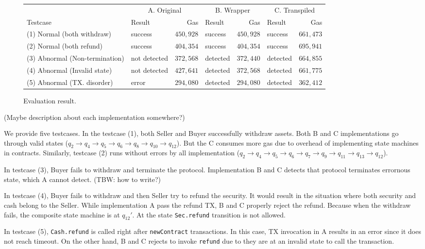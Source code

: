 \documentclass[english]{jsarticle}
\begin{document}
\begin{figure}
\centering
\begin{tabular}{llrlrlr}\toprule
& \multicolumn{2}{c}{A. Original}
& \multicolumn{2}{c}{B. Wrapper}
& \multicolumn{2}{c}{C. Transpiled} \\
\cmidrule(lr){2-3} \cmidrule(lr){4-5} \cmidrule(lr){6-7}
Testcase & Result & Gas & Result & Gas & Result & Gas \\
\midrule
(1) Normal (both withdraw) & success & $450,928$ & success & $450,928$ & success & $661,473$ \\
(2) Normal (both refund) & success & $404,354$ & success & $404,354$ & success & $695,941$ \\
(3) Abnormal (Non-termination) & not detected & $372,568$ & detected & $372,440$ & detected & $664,855$ \\
(4) Abnormal (Invalid state) & not detected & $427,641$ & detected & $372,568$ & detected & $661,775$ \\
(5) Abnormal (TX. disorder) & error & $294,080$ & detected & $294,080$ & detected & $362,412$ \\
\bottomrule
\end{tabular}
\caption{Evaluation result.}
\end{figure}

(Maybe description about each implementation somewhere?)

We provide five testcases.
In the testcase (1), both Seller and Buyer successfully withdraw assets. 
Both B and C implementations go through valid states ($q_2\to q_4\to q_5\to q_6 \to q_8\to q_{10}\to q_{12}$).
But the C consumes more gas due to overhead of implementing state machines in contracts.
Similarly, testcase (2) runs without errors by all implementation ($q_2\to q_4\to q_5\to q_6 \to q_7 \to q_9\to q_{11}\to q_{13} \to q_{12}$).

In testcase (3), Buyer fails to withdraw and terminate the protocol. Implementation B and C detects that protocol terminates 
errornous state, which A cannot detect. (TBW: how to write?)

In testcase (4), Buyer fails to withdraw and then Seller try to refund the security.
It would result in the situation where both security and cash belong to the Seller.
While implementation A pass the refund TX, B and C properly reject the refund.
Because when the withdraw fails, the composite state machine is at $q_{12}'$.
At the state \texttt{Sec.refund} transition is not allowed.


In testcase (5), \texttt{Cash.refund} is called right after \texttt{newContract} transactions.
In this case, TX invocation in A results in an error since it does not reach timeout.
On the other hand, B and C rejects to invoke \texttt{refund} due to they are at an invalid state to call the transaction.
\end{document}
